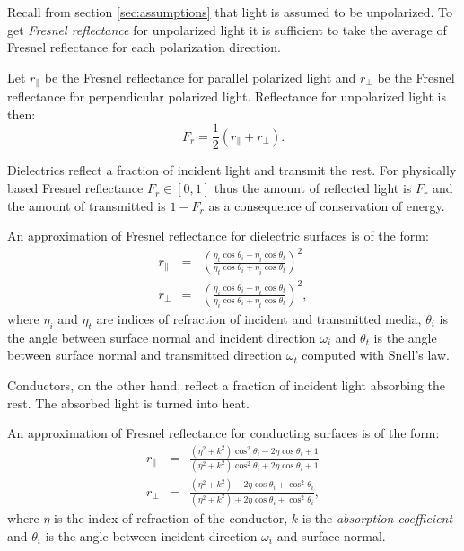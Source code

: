 Recall from section \ref{sec:assumptions} that light is assumed to be unpolarized. To get \emph{Fresnel reflectance} for unpolarized light it is sufficient to take the average of Fresnel reflectance for each polarization direction.

\begin{df}
Let $r_{\parallel}$ be the Fresnel reflectance for parallel polarized light and $r_{\perp}$ be the Fresnel reflectance for perpendicular polarized light. Reflectance for unpolarized light is then:
\begin{equation}
  F_{r} = \frac{1}{2} (r_{\parallel} + r_{\perp}).
\end{equation}
\end{df}

Dielectrics reflect a fraction of incident light and transmit the rest. For physically based Fresnel reflectance $F_{r} \in [0,1]$ thus the amount of reflected light is $F_{r}$ and the amount of transmitted is $1 - F_{r}$ as a consequence of conservation of energy.

\begin{df}
An approximation of Fresnel reflectance for dielectric surfaces \parencite{phar2010} is of the form:
\begin{eqnarray}
r_{\parallel} &=& \left( \frac{\eta_{t} \cos\theta_{i} - \eta_{i} \cos\theta_{t}}{\eta_{t} \cos\theta_{i} + \eta_{i} \cos\theta_{t}} \right)^{2} \\
r_{\perp} &=& \left( \frac{\eta_{i} \cos\theta_{i} - \eta_{t} \cos\theta_{t}}{\eta_{i} \cos\theta_{i} + \eta_{t} \cos\theta_{t}} \right)^{2},
\end{eqnarray}
where $\eta_{i}$ and $\eta_{t}$ are indices of refraction of incident and transmitted media, $\theta_{i}$ is the angle between surface normal and incident direction $\omega_{i}$ and $\theta_{t}$ is the angle between surface normal and transmitted direction $\omega_{t}$ computed with Snell's law.
\end{df}

Conductors, on the other hand, reflect a fraction of incident light absorbing the rest. The absorbed light is turned into heat.

\begin{df}
An approximation of Fresnel reflectance for conducting surfaces \parencite{phar2010} is of the form:
\begin{eqnarray}
  r_{\parallel} &=& \frac{(\eta^{2} + k^{2}) \cos^{2}\theta_{i} - 2\eta\cos\theta_{i} + 1}{(\eta^{2} + k^{2}) \cos^{2}\theta_{i} + 2\eta\cos\theta_{i} + 1} \\
  r_{\perp} &=& \frac{(\eta^{2} + k^{2}) - 2\eta\cos\theta_{i} + \cos^{2}\theta_{i}}{(\eta^{2} + k^{2}) + 2\eta\cos\theta_{i} + \cos^{2}\theta_{i}},
\end{eqnarray}
where $\eta$ is the index of refraction of the conductor, $k$ is the \emph{absorption coefficient} and $\theta_{i}$ is the angle between incident direction $\omega_{i}$ and surface normal.
\end{df}

